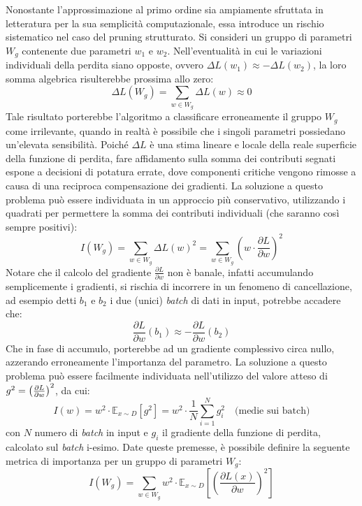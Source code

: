 Nonostante l'approssimazione al primo ordine sia ampiamente sfruttata in
letteratura per la sua semplicità computazionale, essa introduce un rischio
sistematico nel caso del pruning strutturato. Si consideri un gruppo di
parametri $W_g$ contenente due parametri $w_1$ e $w_2$. Nell'eventualità in cui
le variazioni individuali della perdita siano opposte, ovvero $\Delta L(w_1)
    \approx - \Delta L(w_2)$, la loro somma algebrica risulterebbe prossima allo
zero:
\begin{equation}
    \Delta L(W_g) = \sum_{w \in W_g} \Delta L(w) \approx 0
\end{equation}
Tale risultato porterebbe l'algoritmo a classificare erroneamente il gruppo $W_g$ come irrilevante, quando in realtà è possibile che i singoli parametri possiedano un'elevata sensibilità. Poiché $\Delta L$ è una stima lineare e locale della reale superficie della funzione di perdita, fare affidamento sulla somma dei contributi segnati espone a decisioni di potatura errate, dove componenti critiche vengono rimosse a causa di una reciproca compensazione dei gradienti. \newline
La soluzione a questo problema può essere individuata in un approccio più conservativo, utilizzando i quadrati per permettere la somma dei contributi individuali (che saranno così sempre positivi):
\begin{equation}
    {I}(W_g) = \sum_{w \in W_g} \Delta L(w)^2 = \sum_{w \in W_g} \left ( w \cdot \frac{\partial L}{\partial w}\right )^2
\end{equation} \newline
Notare che il calcolo del gradiente $\frac{\partial L}{\partial w}$ non è banale, infatti accumulando semplicemente i gradienti, si rischia di incorrere in un fenomeno di cancellazione, ad esempio detti $b_1$ e $b_2$ i due (unici) \textit{batch} di dati in input, potrebbe accadere che:
\begin{equation}
    \frac{\partial L}{\partial w}(b_1) \approx - \frac{\partial L}{\partial w}(b_2)
\end{equation}
Che in fase di accumulo, porterebbe ad un gradiente complessivo circa nullo, azzerando erroneamente l'importanza del parametro. \newline
La soluzione a questo problema può essere facilmente individuata nell'utilizzo del valore atteso di $g^2 = \left (\partial {L} \over \partial {w} \right )^2$, da cui:
\begin{equation}
    {I}(w) = w^2 \cdot \mathbb{E}_{x \sim {D}}[g^2] = w^2 \cdot \frac{1}{N} \sum_{i=1}^{N} g_i^2 \quad \text{(medie sui batch)}
\end{equation}
con $N$ numero di \textit{batch} in input e $g_i$ il gradiente della funzione di perdita, calcolato sul \textit{batch} i-esimo. \newline
Date queste premesse, è possibile definire la seguente metrica di importanza per un gruppo di parametri $W_g$:
\begin{equation}
    {I}(W_g) =\sum_{w \in W_g} w^2 \cdot \mathbb{E}_{x \sim {D}} \left[ \left( \frac{\partial L(x)}{\partial w} \right)^2 \right]
\end{equation}

